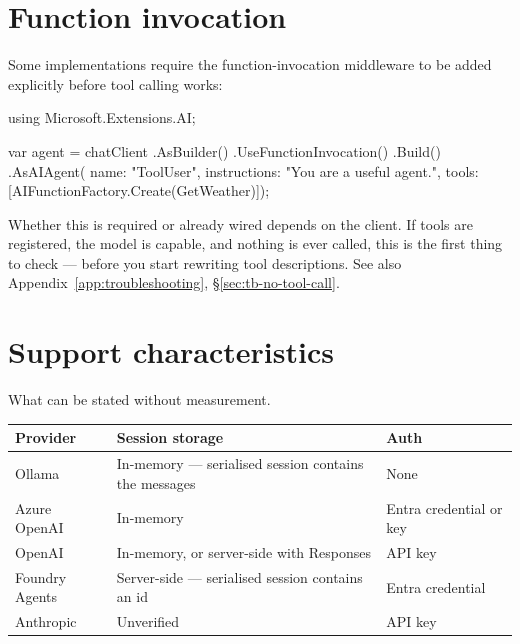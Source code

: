\section{Function invocation}

Some  implementations require the function-invocation middleware
to be added explicitly before tool calling works:

\begin{csharp}[caption={Adding function invocation to a chat client}, label={lst:prov-funcinvoke}]
using Microsoft.Extensions.AI;

var agent = chatClient
    .AsBuilder()
    .UseFunctionInvocation()
    .Build()
    .AsAIAgent(
        name: "ToolUser",
        instructions: "You are a useful agent.",
        tools: [AIFunctionFactory.Create(GetWeather)]);
\end{csharp}

\begin{note}
Whether this is required or already wired depends on the client. If tools are
registered, the model is capable, and nothing is ever called, this is the first
thing to check --- before you start rewriting tool descriptions. See also
Appendix~\ref{app:troubleshooting}, \S\ref{sec:tb-no-tool-call}.
\end{note}

\section{Support characteristics}

What can be stated without measurement.

\begin{center}
\small
\begin{tabularx}{\linewidth}{@{}lXX@{}}
\toprule
\textbf{Provider} & \textbf{Session storage} & \textbf{Auth} \\
\midrule
Ollama & In-memory --- serialised session contains the messages & None \\
Azure OpenAI & In-memory & Entra credential or key \\
OpenAI & In-memory, or server-side with Responses & API key \\
Foundry Agents & Server-side --- serialised session contains an id & Entra credential \\
Anthropic & Unverified & API key \\
\bottomrule
\end{tabularx}
\end{center}

